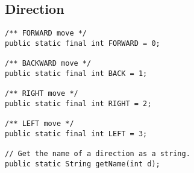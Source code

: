 \documentclass[11pt]{article}
\begin{document}
\subsection{Direction}
\begin{lstlisting}
/** FORWARD move */
public static final int FORWARD = 0;

/** BACKWARD move */
public static final int BACK = 1;

/** RIGHT move */
public static final int RIGHT = 2;

/** LEFT move */
public static final int LEFT = 3;

// Get the name of a direction as a string.
public static String getName(int d);
\end{lstlisting}
\end{document}

